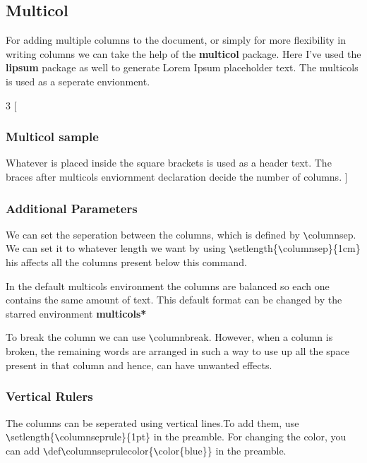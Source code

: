 \documentclass[12pt letterpaper]{article}
\begin{document}
    \subsection{Multicol}
    For adding multiple columns to the document, or simply for more flexibility in writing columns
    we can take the help of the \textbf{multicol} package. Here I've used the \textbf{lipsum} package as well to generate 
    Lorem Ipsum placeholder text. The multicols is used as a seperate envionment.
    
        \begin{multicols}{3}
        [
            \subsubsection{Multicol sample}
            Whatever is placed inside the square brackets is used as a header text.
            The braces after multicols enviornment declaration decide the number of columns.
        ]
        \lipsum[1]
        \end{multicols}
    
        \subsubsection{Additional Parameters}
        We can set the seperation between the columns, which is defined by \verb!\!columnsep. We can
        set it to whatever length we want by using \verb!\!setlength\{\verb!\!columnsep\}\{1cm\} 
        his affects all the columns present below this command.

        In the default multicols environment the columns are balanced so each one contains the 
        same amount of text. This default format can be changed by the starred environment \textbf{multicols*}

        To break the column we can use \verb!\!columnbreak. However, when a column is broken,
        the remaining words are arranged in such a way to use up all the space present in that column
        and hence, can have unwanted effects.

        \subsubsection{Vertical Rulers}
        The columns can be seperated using vertical lines.To add them, 
        use \verb!\!setlength\{\verb!\!columnseprule\}\{1pt\} in the preamble.
        For changing the color, you can add \verb!\!def\verb!\!columnseprulecolor\{\verb!\!color\{blue\}\}
        in the preamble.











\printindex
\end{document}
